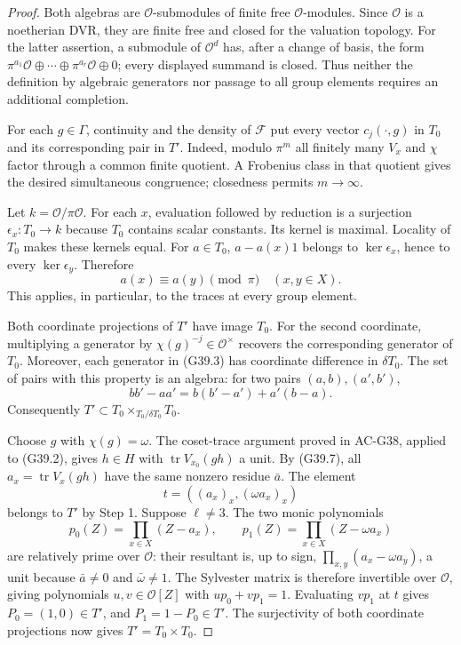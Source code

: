 \begin{proof}
Both algebras are $\mathcal O$-submodules of finite free
$\mathcal O$-modules.  Since $\mathcal O$ is a noetherian DVR,
they are finite free and closed for the valuation topology.
For the latter assertion, a submodule of $\mathcal O^d$ has,
after a change of basis, the form
$\pi^{a_1}\mathcal O\oplus\cdots\oplus
\pi^{a_r}\mathcal O\oplus0$; every displayed summand is closed.
Thus neither the definition by algebraic generators nor passage
to all group elements requires an additional completion.

For each $g\in\Gamma$, continuity and the density of
$\mathcal F$ put every vector $c_j(\cdot,g)$ in $T_0$ and
its corresponding pair in $T'$.  Indeed, modulo $\pi^m$ all
finitely many $V_x$ and $\chi$ factor through a common finite
quotient.  A Frobenius class in that quotient gives the desired
simultaneous congruence; closedness permits $m\to\infty$.

Let $k=\mathcal O/\pi\mathcal O$.  For each $x$, evaluation
followed by reduction is a surjection $\epsilon_x:T_0\to k$
because $T_0$ contains scalar constants.  Its kernel is maximal.
Locality of $T_0$ makes these kernels equal.  For $a\in T_0$,
$a-a(x)1$ belongs to $\ker\epsilon_x$, hence to every
$\ker\epsilon_y$.  Therefore
\[
                      a(x)\equiv a(y)\pmod\pi
                           \quad(x,y\in X).                  \tag{G39.7}
\]
This applies, in particular, to the traces at every group element.

Both coordinate projections of $T'$ have image $T_0$.
For the second coordinate, multiplying a generator by
$\chi(g)^{-j}\in\mathcal O^\times$ recovers the corresponding
generator of $T_0$.  Moreover, each generator in (G39.3) has
coordinate difference in $\delta T_0$.  The set of pairs with
this property is an algebra: for two pairs $(a,b),(a',b')$,
\[
                  bb'-aa'=b(b'-a')+a'(b-a).
\]
Consequently
$T'\subset T_0\times_{T_0/\delta T_0}T_0$.

Choose $g$ with $\chi(g)=\omega$.  The coset-trace argument
proved in AC-G38, applied to (G39.2), gives $h\in H$ with
$\operatorname{tr}V_{x_0}(gh)$ a unit.  By (G39.7), all
$a_x=\operatorname{tr}V_x(gh)$ have the same nonzero residue
$\bar a$.  The element
\[
                         t=((a_x)_x,(\omega a_x)_x)
\]
belongs to $T'$ by Step 1.  Suppose $\ell\ne3$.  The two
monic polynomials
\[
             p_0(Z)=\prod_{x\in X}(Z-a_x),\qquad
             p_1(Z)=\prod_{x\in X}(Z-\omega a_x)
\]
are relatively prime over $\mathcal O$: their resultant
is, up to sign, $\prod_{x,y}(a_x-\omega a_y)$, a unit
because $\bar a\ne0$ and $\bar\omega\ne1$.
The Sylvester matrix is therefore invertible over
$\mathcal O$, giving polynomials $u,v\in\mathcal O[Z]$
with $up_0+vp_1=1$.  Evaluating $vp_1$ at $t$ gives
$P_0=(1,0)\in T'$, and $P_1=1-P_0\in T'$.
The surjectivity of both coordinate projections now gives
$T'=T_0\times T_0$.


\end{proof}
